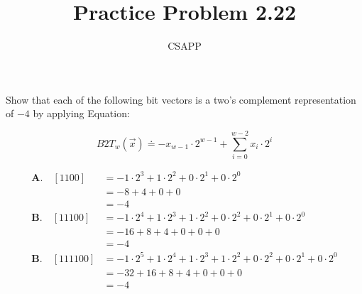 \documentclass{article}
\title{Practice Problem 2.22}
\author{CSAPP}
\begin{document}
\maketitle

\noindent Show that each of the following bit vectors is a two's complement
representation of $-4$ by applying Equation:

\[
    B2T_w(\vec{x}) \doteq -x_{w-1} \cdot 2^{w-1} + \sum_{i=0}^{w-2} x_i \cdot 2^i
\]

\begin{align*}
    \textbf{A.} \quad [1100]   &= -1\cdot2^3 + 1\cdot2^2 + 0\cdot2^1 + 0\cdot2^0 \\
                               &= -8 + 4 + 0 + 0 \\
                               &= -4\\
    \textbf{B.} \quad [11100]  &= -1\cdot2^4 + 1\cdot2^3 + 1\cdot2^2 + 0\cdot2^2 + 0\cdot2^1 + 0\cdot2^0\\
                               &= -16 + 8 + 4 + 0 + 0 + 0\\
                               &= -4\\
    \textbf{B.} \quad [111100] &= -1\cdot2^5 +1\cdot2^4 + 1\cdot2^3 + 1\cdot2^2 + 0\cdot2^2 + 0\cdot2^1 + 0\cdot2^0\\
                               &= -32 + 16 + 8 + 4 + 0 + 0 + 0\\
                               &= -4\\
\end{align*}    
\end{document}
